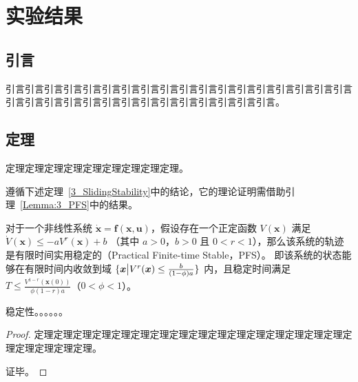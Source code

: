 
\chapter{实验结果}
\label{cha:Chapter3}


\section{引言}
\label{sec:3_Introduction}

引言引言引言引言引言引言引言引言引言引言引言引言引言引言引言引言引言引言引言引言引言引言引言引言引言引言引言引言引言引言引言引言。



\section{定理}
\label{sec:3_BodyKinematics}

定理定理定理定理定理定理定理定理定理。

遵循下述定理~\ref{3_SlidingStability}中的结论，它的理论证明需借助引理~\ref{Lemma:3_PFS}中的结果。


\begin{lemma}
\label{Lemma:3_PFS}
对于一个非线性系统 $\dot{\bm x} = \bm{f(x, u)}$，假设存在一个正定函数 $V({\bm x})$ 满足 ${\dot V}({\bm x}) \leq - a V^r({\bm x}) + b$ （其中 $a>0$，$b>0$ 且 $0<r<1$），那么该系统的轨迹是有限时间实用稳定的（Practical Finite-time Stable，PFS）。
即该系统的状态能够在有限时间内收敛到域 $\{ {\bm x} \big{|} V^r({\bm x}) \leq \frac{b}{(1-\phi)a} \}$ 内，且稳定时间满足 $T \leq \frac{V^{1-r}({\bm x}(0))}{\phi(1-r)a}$（$0 < \phi < 1$）。
\end{lemma}


\begin{theorem}
\label{3_SlidingStability}
稳定性。。。。。。
\end{theorem}


\begin{proof}
定理定理定理定理定理定理定理定理定理定理定理定理定理定理定理定理定理定理定理定理定理。

证毕。
\end{proof}



